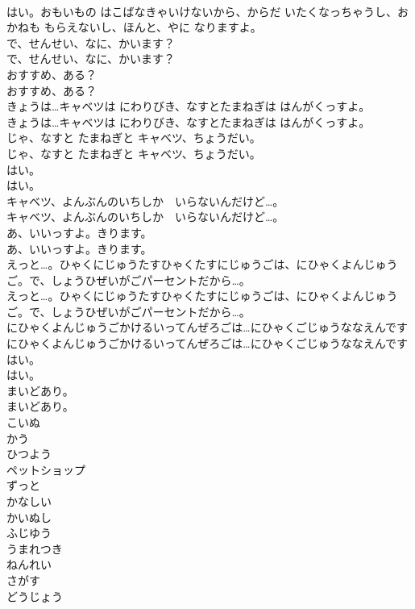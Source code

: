 \documentclass[8pt]{extreport}
\begin{document}
\begin{CJK}{UTF8}{min}
\\	はい。おもいもの はこばなきゃいけないから、からだ いたくなっちゃうし、おかねも もらえないし、ほんと、やに なりますよ。
\\	で、せんせい、なに、かいます？
\\	で、せんせい、なに、かいます？
\\	おすすめ、ある？
\\	おすすめ、ある？
\\	きょうは…キャベツは にわりびき、なすとたまねぎは はんがくっすよ。
\\	きょうは…キャベツは にわりびき、なすとたまねぎは はんがくっすよ。
\\	じゃ、なすと たまねぎと キャベツ、ちょうだい。
\\	じゃ、なすと たまねぎと キャベツ、ちょうだい。
\\	はい。
\\	はい。
\\	キャベツ、よんぶんのいちしか　いらないんだけど…。
\\	キャベツ、よんぶんのいちしか　いらないんだけど…。
\\	あ、いいっすよ。きります。
\\	あ、いいっすよ。きります。
\\	えっと…。ひゃくにじゅうたすひゃくたすにじゅうごは、にひゃくよんじゅうご。で、しょうひぜいがごパーセントだから…。
\\	えっと…。ひゃくにじゅうたすひゃくたすにじゅうごは、にひゃくよんじゅうご。で、しょうひぜいがごパーセントだから…。
\\	にひゃくよんじゅうごかけるいってんぜろごは…にひゃくごじゅうななえんです
\\	にひゃくよんじゅうごかけるいってんぜろごは…にひゃくごじゅうななえんです
\\	はい。
\\	はい。
\\	まいどあり。
\\	まいどあり。
\\	こいぬ
\\	かう
\\	ひつよう
\\	ペットショップ
\\	ずっと
\\	かなしい
\\	かいぬし
\\	ふじゆう
\\	うまれつき
\\	ねんれい
\\	さがす
\\	どうじょう

\end{CJK}
\end{document}
